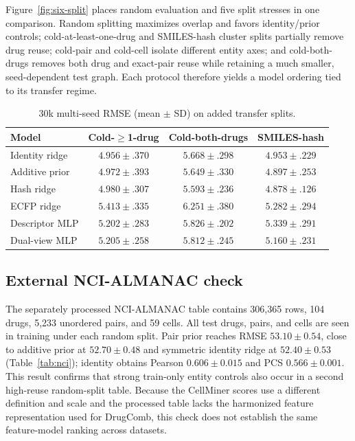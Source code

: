 \documentclass[conference]{IEEEtran}
\begin{document}
Figure~\ref{fig:six-split} places random evaluation and five split stresses in one comparison. Random splitting maximizes overlap and favors identity/prior controls; cold-at-least-one-drug and SMILES-hash cluster splits partially remove drug reuse; cold-pair and cold-cell isolate different entity axes; and cold-both-drugs removes both drug and exact-pair reuse while retaining a much smaller, seed-dependent test graph. Each protocol therefore yields a model ordering tied to its transfer regime.

\begin{table}[!t]
\centering
\scriptsize
\setlength{\tabcolsep}{3pt}
\caption{30k multi-seed RMSE (mean $\pm$ SD) on added transfer splits.}
\label{tab:cold}
\begin{tabular}{lccc}
\toprule
Model & Cold-$\geq$1-drug & Cold-both-drugs & SMILES-hash \\
\midrule
Identity ridge & $4.956\pm.370$ & $5.668\pm.298$ & $4.953\pm.229$ \\
Additive prior & $4.972\pm.393$ & $5.649\pm.330$ & $4.897\pm.253$ \\
Hash ridge & $4.980\pm.307$ & $5.593\pm.236$ & $4.878\pm.126$ \\
ECFP ridge & $5.413\pm.335$ & $6.251\pm.380$ & $5.282\pm.294$ \\
Descriptor MLP & $5.202\pm.283$ & $5.826\pm.202$ & $5.339\pm.291$ \\
Dual-view MLP & $5.205\pm.258$ & $5.812\pm.245$ & $5.160\pm.231$ \\
\bottomrule
\end{tabular}
\end{table}

\subsection{External NCI-ALMANAC check}

The separately processed NCI-ALMANAC table contains 306,365 rows, 104 drugs, 5,233 unordered pairs, and 59 cells. All test drugs, pairs, and cells are seen in training under each random split. Pair prior reaches RMSE $53.10\pm0.54$, close to additive prior at $52.70\pm0.48$ and symmetric identity ridge at $52.40\pm0.53$ (Table~\ref{tab:nci}); identity obtains Pearson $0.606\pm0.015$ and PCS $0.566\pm0.001$. This result confirms that strong train-only entity controls also occur in a second high-reuse random-split table. Because the CellMiner scores use a different definition and scale and the processed table lacks the harmonized feature representation used for DrugComb, this check does not establish the same feature-model ranking across datasets.
\end{document}
